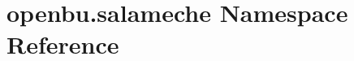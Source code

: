 \hypertarget{namespaceopenbu_1_1salameche}{}\section{openbu.\+salameche Namespace Reference}
\label{namespaceopenbu_1_1salameche}
